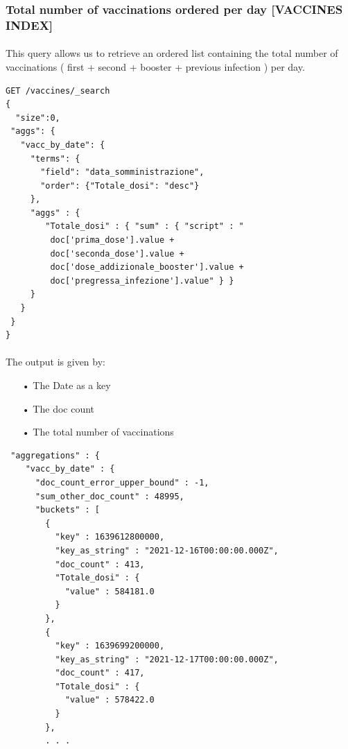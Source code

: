 \documentclass[a4paper,12pt]{article}
\begin{document}
\subsubsection{Total number of vaccinations ordered per day [VACCINES INDEX]}
\paragraph{} This query allows us to retrieve an ordered list containing the total number of vaccinations ( first + second + booster + previous infection ) per day.
\begin{tcolorbox}[colback=green!5!white,colframe=green!75!black,title=QUERY]
\begin{verbatim}
GET /vaccines/_search
{
  "size":0,
 "aggs": {
   "vacc_by_date": {
     "terms": {
       "field": "data_somministrazione",
       "order": {"Totale_dosi": "desc"}
     },
     "aggs" : {
        "Totale_dosi" : { "sum" : { "script" : "
         doc['prima_dose'].value +
         doc['seconda_dose'].value + 
         doc['dose_addizionale_booster'].value +
         doc['pregressa_infezione'].value" } }
     }
   }
 }
}
\end{verbatim}
\end{tcolorbox}
\newpage

\paragraph{} The output is given by: 
\begin{itemize}[noitemsep]
\item[•] The Date as a key
\item[•] The doc count
\item[•] The total number of vaccinations
\end{itemize}
\begin{tcolorbox}[colback=red!5!white,colframe=red!75!black,title=OUTPUT]
\begin{verbatim}
 "aggregations" : {
    "vacc_by_date" : {
      "doc_count_error_upper_bound" : -1,
      "sum_other_doc_count" : 48995,
      "buckets" : [
        {
          "key" : 1639612800000,
          "key_as_string" : "2021-12-16T00:00:00.000Z",
          "doc_count" : 413,
          "Totale_dosi" : {
            "value" : 584181.0
          }
        },
        {
          "key" : 1639699200000,
          "key_as_string" : "2021-12-17T00:00:00.000Z",
          "doc_count" : 417,
          "Totale_dosi" : {
            "value" : 578422.0
          }
        },
        . . .
\end{verbatim}
\end{tcolorbox}
\newpage
\end{document}
